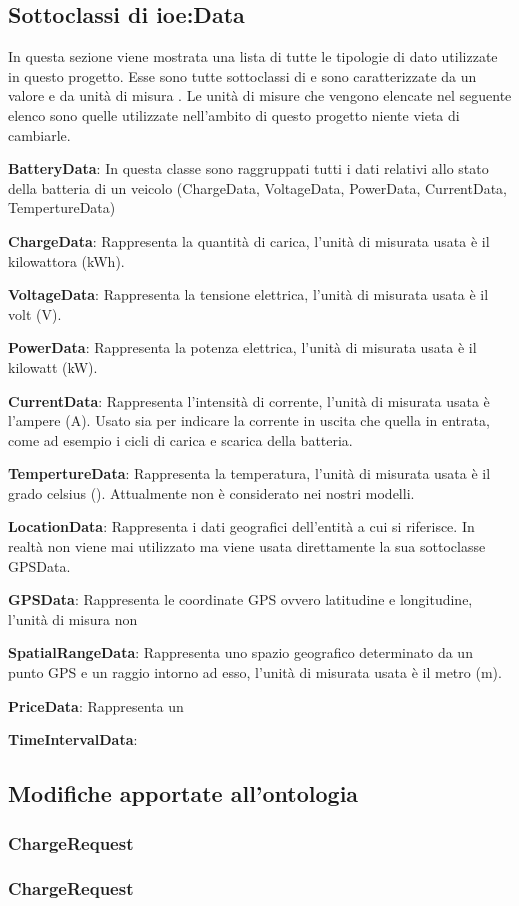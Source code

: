 \subsection{Sottoclassi di ioe:Data}\label{subsec:ioe-data}

In questa sezione viene mostrata una lista di tutte le tipologie di dato utilizzate in questo progetto. Esse sono tutte sottoclassi di  e sono caratterizzate da un valore e da unità di misura . Le unità di misure che vengono elencate nel seguente elenco sono quelle utilizzate nell'ambito di questo progetto niente vieta di cambiarle.

\begin{description}
	\item \textbf{BatteryData}: In questa classe sono raggruppati tutti i dati relativi allo stato della batteria di un veicolo (ChargeData, VoltageData, PowerData, CurrentData, TempertureData)
	\item \textbf{ChargeData}: Rappresenta la quantità di carica, l'unità di misurata usata è il kilowattora (kWh).
	\item \textbf{VoltageData}: Rappresenta la tensione elettrica, l'unità di misurata usata è il volt (V).
	\item \textbf{PowerData}: Rappresenta la potenza elettrica, l'unità di misurata usata è il kilowatt (kW). 
	\item \textbf{CurrentData}: Rappresenta l'intensità di corrente, l'unità di misurata usata è l'ampere (A). Usato sia per indicare la corrente in uscita che quella in entrata, come ad esempio i cicli di carica e scarica della batteria.
	\item \textbf{TempertureData}: Rappresenta la temperatura, l'unità di misurata usata è il grado celsius (\textcelsius). Attualmente non è considerato nei nostri modelli.
	\item \textbf{LocationData}: Rappresenta i dati geografici dell'entità a cui si riferisce. In realtà non viene mai utilizzato ma viene usata direttamente la sua sottoclasse GPSData.
	\item \textbf{GPSData}: Rappresenta le coordinate GPS ovvero latitudine e longitudine, l'unità di misura non 
	\item \textbf{SpatialRangeData}: Rappresenta uno spazio geografico determinato da un punto GPS e un raggio intorno ad esso, l'unità di misurata usata è il metro (m).
	\item \textbf{PriceData}: Rappresenta un 
	\item \textbf{TimeIntervalData}:
\end{description}



\subsection{Modifiche apportate all'ontologia}

\subsubsection{ChargeRequest}\label{subsubsec:chargerequest}

\subsubsection{ChargeRequest}\label{subsubsec:chargeresponse}